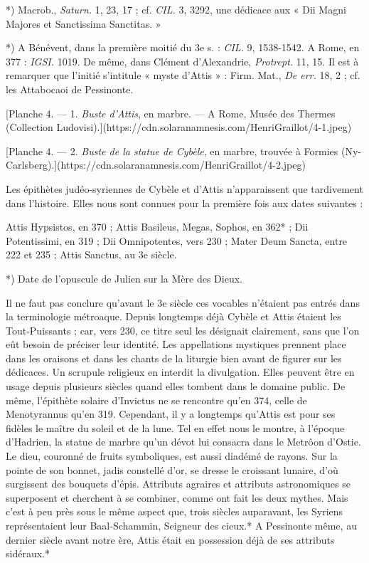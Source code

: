 \documentclass[a4paper, 11pt, oneside, polutonikogreek, french]{article}
\begin{document}
*) Macrob., \emph{Saturn.} 1, 23, 17 ; cf. \emph{CIL.} 3, 3292, une dédicace aux « Dii Magni Majores et Sanctissima Sanctitas. »

*) A Bénévent, dans la première moitié du 3e s. : \emph{CIL.} 9, 1538-1542. A Rome, en 377 : \emph{IGSI.} 1019. De même, dans Clément d'Alexandrie, \emph{Protrept.} 11, 15. Il est à remarquer que l'initié s'intitule « myste d'Attis » : Firm. Mat., \emph{De err.} 18, 2 ; cf. les Attabocaoi de Pessinonte.

[Planche 4. --- 1. \emph{Buste d'Attis}, en marbre. --- A Rome, Musée des Thermes (Collection Ludovisi).](https://cdn.solaranamnesis.com/HenriGraillot/4-1.jpeg)

[Planche 4. --- 2. \emph{Buste de la statue de Cybèle}, en marbre, trouvée à Formies (Ny-Carlsberg).](https://cdn.solaranamnesis.com/HenriGraillot/4-2.jpeg)

Les épithètes judéo-syriennes de Cybèle et d'Attis n'apparaissent que tardivement dans l'histoire. Elles nous sont connues pour la première fois aux dates suivantes :

Attis Hypsistos, en 370 ;  
Attis Basileus, Megas, Sophos, en 362* ;  
Dii Potentissimi, en 319 ;  
Dii Omnipotentes, vers 230 ;  
Mater Deum Sancta, entre 222 et 235 ;  
Attis Sanctus, au 3e siècle.

*) Date de l'opuscule de Julien sur la Mère des Dieux.

Il ne faut pas conclure qu'avant le 3e siècle ces vocables n'étaient pas entrés dans la terminologie métroaque. Depuis longtemps déjà Cybèle et Attis étaient les Tout-Puissants ; car, vers 230, ce titre seul les désignait clairement, sans que l'on eût besoin de préciser leur identité. Les appellations mystiques prennent place dans les oraisons et dans les chants de la liturgie bien avant de figurer sur les dédicaces. Un scrupule religieux en interdit la divulgation. Elles peuvent être en usage depuis plusieurs siècles quand elles tombent dans le domaine public. De même, l'épithète solaire d'Invictus ne se rencontre qu'en 374, celle de Menotyrannus qu'en 319. Cependant, il y a longtemps qu'Attis est pour ses fidèles le maître du soleil et de la lune. Tel en effet nous le montre, à l'époque d'Hadrien, la statue de marbre qu'un dévot lui consacra dans le Metrôon d'Ostie. Le dieu, couronné de fruits symboliques, est aussi diadémé de rayons. Sur la pointe de son bonnet, jadis constellé d'or, se dresse le croissant lunaire, d'où surgissent des bouquets d'épis. Attributs agraires et attributs astronomiques se superposent et cherchent à se combiner, comme ont fait les deux mythes. Mais c'est à peu près sous le même aspect que, trois siècles auparavant, les Syriens représentaient leur Baal-Schammin, Seigneur des cieux.* A Pessinonte même, au dernier siècle avant notre ère, Attis était en possession déjà de ses attributs sidéraux.*
\end{document}
